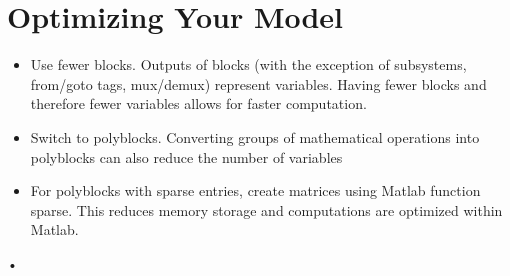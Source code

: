 \documentclass[12pt]{report}
\begin{document}
\section{Optimizing Your Model}
\begin{itemize}
\item Use fewer blocks.  Outputs of blocks (with the exception of subsystems, from/goto tags, mux/demux) represent variables.  Having fewer blocks and therefore fewer variables allows for faster computation.
\item Switch to polyblocks.  Converting groups of mathematical operations into polyblocks can also reduce the number of variables
\item For polyblocks with sparse entries, create matrices using Matlab function sparse.  This reduces memory storage and computations are optimized within Matlab.
\end{itemize}•

\clearpage
\end{document}
